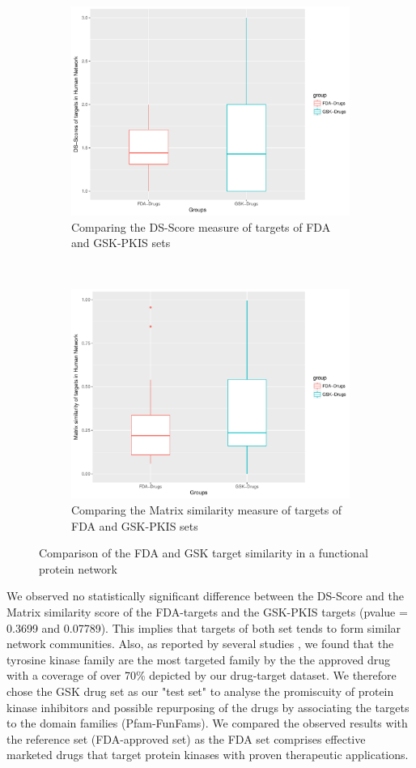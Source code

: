 \documentclass[a4paper, 11pt]{article}
\begin{document}
\begin{figure}[H]
\centering
\begin{subfigure}{\textwidth}
	\includegraphics[width=.8\linewidth]{figures/dsscoreFDGS.pdf}
	\centering
	\caption{Comparing the DS-Score measure of targets of FDA and GSK-PKIS sets}
	\label{ksimgsk}
\end{subfigure}\\
\begin{subfigure}{\textwidth}
	\includegraphics[width=.8\linewidth]{figures/ksimscoreFDGS.pdf}
	\centering
	\caption{Comparing the Matrix similarity measure of targets of FDA and GSK-PKIS sets}
	\label{dsgsk}
\end{subfigure}
\caption{Comparison of the FDA and GSK target similarity in a functional protein network }
\label{simfdagsk}
\end{figure}

We observed no statistically significant difference between the DS-Score and the Matrix similarity score of the FDA-targets and the GSK-PKIS targets (pvalue = 0.3699 and 0.07789). This implies that targets of both set tends to form similar network communities. Also, as reported by several studies \cite{wu2015fda}, we found that the tyrosine kinase family are the most targeted family by the the approved drug with a coverage of over 70\% depicted by our drug-target dataset. We therefore chose the GSK drug set as our "test set" to analyse the promiscuity of protein kinase inhibitors and possible repurposing of the drugs by associating the targets to the domain families (Pfam-FunFams). We compared the observed results with the reference set (FDA-approved set) as the FDA set comprises effective marketed drugs that target protein kinases with proven therapeutic applications.
\end{document}

